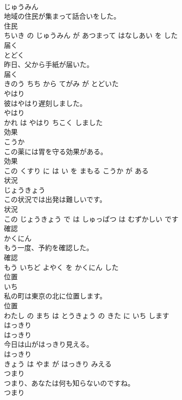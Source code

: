 \documentclass[8pt]{extreport}
\begin{document}
\begin{CJK}{UTF8}{min}
\\	じゅうみん			
\\	地域の住民が集まって話合いをした。	
\\	住民 
\\	ちいき の じゅうみん が あつまって はなしあい を した			
\\	届く	
\\	とどく			
\\	昨日、父から手紙が届いた。	
\\	届く 
\\	きのう ちち から てがみ が とどいた			
\\	やはり	
\\	彼はやはり遅刻しました。	
\\	やはり 
\\	かれ は やはり ちこく しました			
\\	効果	
\\	こうか			
\\	この薬には胃を守る効果がある。	
\\	効果 
\\	この くすり に は い を まもる こうか が ある			
\\	状況	
\\	じょうきょう			
\\	この状況では出発は難しいです。	
\\	状況 
\\	この じょうきょう で は しゅっぱつ は むずかしい です			
\\	確認	
\\	かくにん			
\\	もう一度、予約を確認した。	
\\	確認 
\\	もう いちど よやく を かくにん した			
\\	位置	
\\	いち			
\\	私の町は東京の北に位置します。	
\\	位置 
\\	わたし の まち は とうきょう の きた に いち します			
\\	はっきり	
\\	はっきり			
\\	今日は山がはっきり見える。	
\\	はっきり 
\\	きょう は やま が はっきり みえる			
\\	つまり	
\\	つまり、あなたは何も知らないのですね。	
\\	つまり 

\end{CJK}
\end{document}
